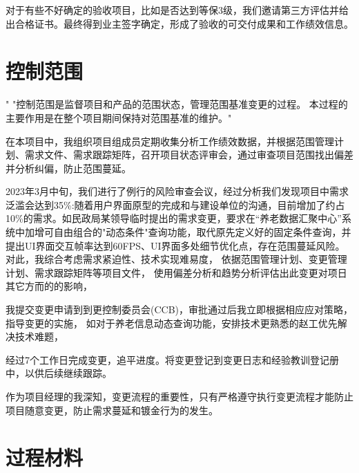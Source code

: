 \documentclass[UTF8]{../computerUniverse}
\begin{document}
对于有些不好确定的验收项目，比如是否达到等保3级，我们邀请第三方评估并给出合格证书。最终得到业主签字确定，形成了验收的可交付成果和工作绩效信息。







\section{控制范围}

"
"控制范围是监督项目和产品的范围状态，管理范围基准变更的过程。
本过程的主要作用是在整个项目期间保持对范围基准的维护。"


在本项目中，我组织项目组成员定期收集分析工作绩效数据，并根据范围管理计划、需求文件、需求跟踪矩阵，召开项目状态评审会，通过审查项目范围找出偏差并分析纠偏，防止范围蔓延。


2023年3月中旬，我们进行了例行的风险审查会议，经过分析我们发现项目中需求泛滥会达到35\%:随着用户界面原型的完成和与建设单位的沟通，目前增加了约占10\%的需求。如民政局某领导临时提出的需求变更，要求在“养老数据汇聚中心”系统中加增可自由组合的"动态条件"查询功能，取代原先定义好的固定条件查询，并提出UI界面交互帧率达到60FPS、UI界面多处细节优化点，存在范围蔓延风险。
对此，我综合考虑需求紧迫性、技术实现难易度，
依据范围管理计划、变更管理计划、需求跟踪矩阵等项目文件，
使用偏差分析和趋势分析评估出此变更对项日其它方而的的影响，

我提交变更申请到到更控制委员会(CCB)，审批通过后我立即根据相应应对策略，指导变更的实施，
如对于养老信息动态查询功能，安排技术更熟悉的赵工优先解决技术难题，

经过7个工作日完成变更，追平进度。将变更登记到变更日志和经验教训登记册中，以供后续继续跟踪。


作为项目经理的我深知，变更流程的重要性，只有严格遵守执行变更流程才能防止项目随意变更，防止需求蔓延和镀金行为的发生。


\section{过程材料}
\begin{lstlisting}

\end{lstlisting}
\end{document}
